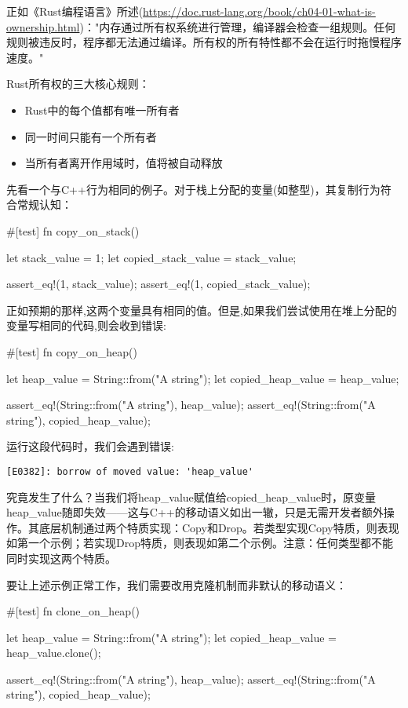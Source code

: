 正如《Rust编程语言》所述(\url{https://doc.rust-lang.org/book/ch04-01-what-is-ownership.html})："内存通过所有权系统进行管理，编译器会检查一组规则。任何规则被违反时，程序都无法通过编译。所有权的所有特性都不会在运行时拖慢程序速度。"

Rust所有权的三大核心规则：

\begin{itemize}
\item 
Rust中的每个值都有唯一所有者

\item 
同一时间只能有一个所有者

\item 
当所有者离开作用域时，值将被自动释放
\end{itemize}

先看一个与C++行为相同的例子。对于栈上分配的变量(如整型)，其复制行为符合常规认知：

\begin{rust}
#[test]
fn copy_on_stack() {
  let stack_value = 1;
  let copied_stack_value = stack_value;

  assert_eq!(1, stack_value);
  assert_eq!(1, copied_stack_value);
}
\end{rust}

正如预期的那样,这两个变量具有相同的值。但是,如果我们尝试使用在堆上分配的变量写相同的代码,则会收到错误:

\begin{rust}
#[test]
fn copy_on_heap() {
  let heap_value = String::from("A string");
  let copied_heap_value = heap_value;

  assert_eq!(String::from("A string"), heap_value);
  assert_eq!(String::from("A string"), copied_heap_value);
}
\end{rust}

运行这段代码时，我们会遇到错误:

\verb|[E0382]: borrow of moved value: 'heap_value'|

究竟发生了什么？当我们将heap\_value赋值给copied\_heap\_value时，原变量heap\_value随即失效——这与C++的移动语义如出一辙，只是无需开发者额外操作。其底层机制通过两个特质实现：Copy和Drop。若类型实现Copy特质，则表现如第一个示例；若实现Drop特质，则表现如第二个示例。注意：任何类型都不能同时实现这两个特质。

要让上述示例正常工作，我们需要改用克隆机制而非默认的移动语义：

\begin{rust}
#[test]
fn clone_on_heap() {
  let heap_value = String::from("A string");
  let copied_heap_value = heap_value.clone();

  assert_eq!(String::from("A string"), heap_value);
  assert_eq!(String::from("A string"), copied_heap_value);
}
\end{rust}

